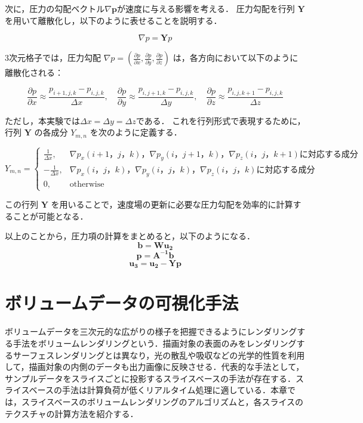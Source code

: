 \documentclass[a4j,12pt]{jreport}
\begin{document}
次に，圧力の勾配ベクトル$\nabla\bm{p}$が速度に与える影響を考える．
圧力勾配を行列 $\bm{Y}$ を用いて離散化し，以下のように表せることを説明する．

\begin{equation}
\nabla p = \bm{Y} p
\end{equation}

3次元格子では，圧力勾配 $\nabla p = (\frac{\partial p}{\partial x}, \frac{\partial p}{\partial y}, \frac{\partial p}{\partial z})$ は，各方向において以下のように離散化される：

\begin{equation}
\frac{\partial p}{\partial x} \approx \frac{p_{i+1,j,k} - p_{i,j,k}}{\Delta x}, \quad
\frac{\partial p}{\partial y} \approx \frac{p_{i,j+1,k} - p_{i,j,k}}{\Delta y}, \quad
\frac{\partial p}{\partial z} \approx \frac{p_{i,j,k+1} - p_{i,j,k}}{\Delta z}
\end{equation}

ただし，本実験では$\varDelta x = \varDelta y= \varDelta z$である．
これを行列形式で表現するために，行列 $\bm{Y}$ の各成分 $Y_{m,n}$ を次のように定義する．

\[
Y_{m,n} =
\begin{cases}
\frac{1}{\varDelta x}, &  \nabla p_x(i+1，j，k)，\nabla p_y(i，j+1，k)，\nabla p_z(i，j，k+1)に対応する成分 \\
-\frac{1}{\varDelta x}, &  \nabla p_x(i，j，k)， \nabla p_y(i，j，k)， \nabla p_z(i，j，k)に対応する成分\\
0, & \text{otherwise}
\end{cases}
\]

この行列 $\bm{Y}$ を用いることで，速度場の更新に必要な圧力勾配を効率的に計算することが可能となる．%


以上のことから，圧力項の計算をまとめると，以下のようになる．
\[
	\bm{b} = \bm{W}\bm{u_2}
\]
\[
	\bm{p} = \bm{A^{-1}}\bm{b}
\]
\[
	\bm{u_3}  =  \bm{u_2} - \bm{Y}\bm{p} 
\]

\section{ボリュームデータの可視化手法}
ボリュームデータを三次元的な広がりの様子を把握できるようにレンダリングする手法をボリュームレンダリングという．描画対象の表面のみをレンダリングするサーフェスレンダリングとは異なり，光の散乱や吸収などの光学的性質を利用して，描画対象の内側のデータも出力画像に反映させる．代表的な手法として，サンプルデータをスライスごとに投影するスライスベースの手法が存在する．スライスベースの手法は計算負荷が低くリアルタイム処理に適している．本章では，スライスベースのボリュームレンダリングのアルゴリズムと，各スライスのテクスチャの計算方法を紹介する．
\end{document}
